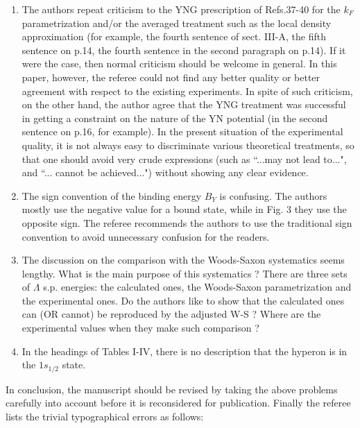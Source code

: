 \begin{enumerate}
\item 
The authors repeat criticism to the YNG prescription of Refs.37-40 for 
the $k_F$ parametrization and/or the averaged treatment such as the 
local density approximation (for example, the fourth sentence of 
sect. III-A, the fifth sentence on p.14, the fourth sentence in the  
second paragraph on p.14). If it were the case, then normal criticism 
should be welcome in general. In this paper, however, the referee could 
not find any better quality or better agreement with respect to the 
existing experiments. In spite of such criticism, on the other hand, 
the author agree that the YNG treatment was successful in getting a 
constraint on the nature of the YN potential (in the second sentence 
on p.16, for example). In the present situation of the 
experimental quality, it is not always easy to discriminate various 
theoretical treatments, so that one should avoid very crude 
expressions (such as ``...may not lead to...", and ``... cannot be 
achieved...") without showing any clear evidence. 

\item 
The sign convention of the binding energy $B_Y$ is confusing. 
The authors mostly use the negative value for a bound state, while 
in Fig. 3 they use the opposite sign. The referee recommends the 
authors to use the traditional sign convention to avoid unnecessary 
confusion for the readers.  

\item
The discussion on the comparison with the Woods-Saxon systematics 
seems lengthy. What is the main purpose of this systematics ? 
There are three sets of $\Lambda$ s.p. energies: the calculated ones, 
the Woods-Saxon parametrization and the experimental ones. 
Do the authors like to show that the calculated ones can (OR cannot)
be reproduced by the adjusted W-S ?  Where are the experimental values 
when they make such comparison ? 

\item 
In the headings of Tables I-IV, there is no description that the 
hyperon is in the $1s_{1/2}$ state.

\end{enumerate}

In conclusion, the manuscript should be revised by taking the above 
problems carefully into account before it is reconsidered for 
publication. Finally the referee lists the trivial typographical 
errors as follows:

